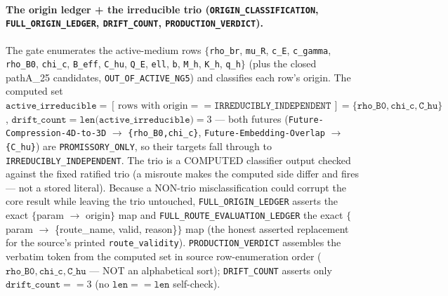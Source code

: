 \paragraph{The origin ledger + the irreducible trio (\texttt{ORIGIN\_CLASSIFICATION}, \texttt{FULL\_ORIGIN\_LEDGER}, \texttt{DRIFT\_COUNT}, \texttt{PRODUCTION\_VERDICT}).}
The gate enumerates the active-medium rows \(\{\)\texttt{rho\_br}, \texttt{mu\_R},
\texttt{c\_E}, \texttt{c\_gamma}, \texttt{rho\_B0}, \texttt{chi\_c},
\texttt{B\_eff}, \texttt{C\_hu}, \texttt{Q\_E}, \texttt{ell}, \texttt{b},
\texttt{M\_h}, \texttt{K\_h}, \texttt{q\_h}\(\}\) (plus the closed pathA\_25
candidates, \texttt{OUT\_OF\_ACTIVE\_NG5}) and classifies each row's origin. The
computed set
\(\texttt{active\_irreducible}=[\,\text{rows with
origin}==\texttt{IRREDUCIBLY\_INDEPENDENT}\,]=\{\texttt{rho\_B0},\texttt{chi\_c},\texttt{C\_hu}\}\),
\(\texttt{drift\_count}=\texttt{len(active\_irreducible)}=3\) --- both futures
(\texttt{Future-Compression-4D-to-3D} \(\to\) \texttt{\{rho\_B0,chi\_c\}},
\texttt{Future-Embedding-Overlap} \(\to\) \texttt{\{C\_hu\}}) are
\texttt{PROMISSORY\_ONLY}, so their targets fall through to
\texttt{IRREDUCIBLY\_INDEPENDENT}. The trio is a COMPUTED classifier output
checked against the fixed ratified trio (a misroute makes the computed side
differ and fires --- not a stored literal). Because a NON-trio misclassification
could corrupt the core result while leaving the trio untouched,
\texttt{FULL\_ORIGIN\_LEDGER} asserts the exact \(\{\)param \(\to\)
origin\(\}\) map and \texttt{FULL\_ROUTE\_EVALUATION\_LEDGER} the exact
\(\{\)param \(\to\) \{route\_name, valid, reason\}\(\}\) map (the honest asserted
replacement for the source's printed \texttt{route\_validity}).
\texttt{PRODUCTION\_VERDICT} assembles the verbatim token from the computed set
in source row-enumeration order (\(\texttt{rho\_B0},\texttt{chi\_c},\texttt{C\_hu}\)
--- NOT an alphabetical sort); \texttt{DRIFT\_COUNT} asserts only
\(\texttt{drift\_count}==3\) (no \(\texttt{len}==\texttt{len}\) self-check).

